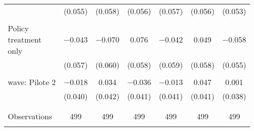 \begin{tabular}{@{\extracolsep{5pt}}lcccccc}
  & (0.055) & (0.058) & (0.056) & (0.057) & (0.056) & (0.053) \\ 
  & & & & & & \\ 
 Policy treatment only & $-$0.043 & $-$0.070 & 0.076 & $-$0.042 & 0.049 & $-$0.058 \\ 
  & (0.057) & (0.060) & (0.058) & (0.059) & (0.058) & (0.055) \\ 
  & & & & & & \\ 
 wave: Pilote 2 & $-$0.018 & 0.034 & $-$0.036 & $-$0.013 & 0.047 & 0.001 \\ 
  & (0.040) & (0.042) & (0.041) & (0.041) & (0.041) & (0.038) \\ 
  & & & & & & \\ 
\hline \\[-1.8ex] 

Observations & 499 & 499 & 499 & 499 & 499 & 499 \\ 
\hline 
\hline \\[-1.8ex] 
\end{tabular} 